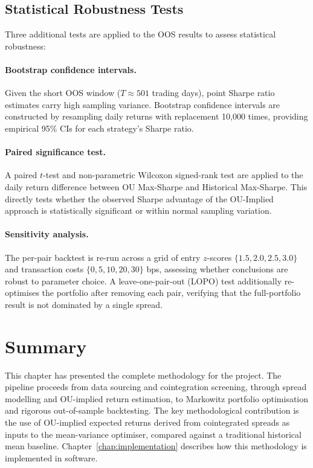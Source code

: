 \documentclass[a4paper]{report}
\begin{document}
\subsection{Statistical Robustness Tests}

Three additional tests are applied to the OOS results to assess statistical robustness:

\paragraph{Bootstrap confidence intervals.} Given the short OOS window ($T \approx 501$ trading days), point Sharpe ratio estimates carry high sampling variance. Bootstrap confidence intervals are constructed by resampling daily returns with replacement 10{,}000 times, providing empirical 95\% CIs for each strategy's Sharpe ratio.

\paragraph{Paired significance test.} A paired $t$-test and non-parametric Wilcoxon signed-rank test are applied to the daily return difference between OU Max-Sharpe and Historical Max-Sharpe. This directly tests whether the observed Sharpe advantage of the OU-Implied approach is statistically significant or within normal sampling variation.

\paragraph{Sensitivity analysis.} The per-pair backtest is re-run across a grid of entry $z$-scores $\{1.5, 2.0, 2.5, 3.0\}$ and transaction costs $\{0, 5, 10, 20, 30\}$ bps, assessing whether conclusions are robust to parameter choice. A leave-one-pair-out (LOPO) test additionally re-optimises the portfolio after removing each pair, verifying that the full-portfolio result is not dominated by a single spread.

\section{Summary}

This chapter has presented the complete methodology for the project. The pipeline proceeds from data sourcing and cointegration screening, through spread modelling and OU-implied return estimation, to Markowitz portfolio optimisation and rigorous out-of-sample backtesting. The key methodological contribution is the use of OU-implied expected returns derived from cointegrated spreads as inputs to the mean-variance optimiser, compared against a traditional historical mean baseline. Chapter~\ref{chap:implementation} describes how this methodology is implemented in software.
\end{document}
